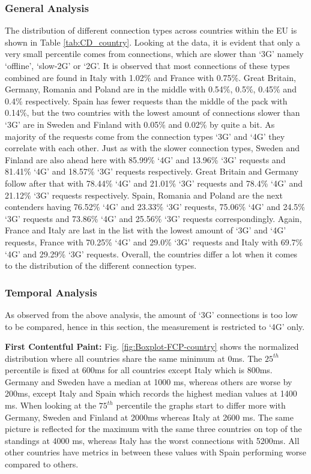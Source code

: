 \subsubsection{General Analysis} The distribution of different connection types across countries within the EU is shown in Table  \ref{tab:CD_country}. Looking at the data, it is evident that only a very small percentile comes from connections, which are slower than `3G’ namely `offline’, `slow-2G’ or `2G’. It is observed that most connections of these types combined are found in Italy with 1.02\% and France with 0.75\%. Great Britain, Germany, Romania and Poland are in the middle with 0.54\%, 0.5\%, 0.45\% and 0.4\% respectively. Spain has fewer requests than the middle of the pack with 0.14\%, but the two countries with the lowest amount of connections slower than `3G’ are in Sweden and Finland with 0.05\% and 0.02\% by quite a bit. As majority of the requests come from the connection types `3G’ and `4G’ they correlate with each other. Just as with the slower connection types, Sweden and Finland are also ahead here with 85.99\% `4G’ and 13.96\% `3G’ requests and 81.41\% `4G’ and 18.57\% `3G’ requests respectively. Great Britain and Germany follow after that with 78.44\% `4G’ and 21.01\% `3G’ requests and 78.4\% `4G’ and 21.12\% `3G’ requests respectively. Spain, Romania and Poland are the next contenders having 76.52\% `4G’ and 23.33\% `3G’ requests, 75.06\% `4G’ and 24.5\% `3G’ requests and 73.86\% `4G’ and 25.56\% `3G’ requests correspondingly. Again, France and Italy are last in the list with the lowest amount of `3G’ and `4G’ requests, France with 70.25\% `4G’ and 29.0\% `3G’ requests and Italy with 69.7\% `4G’ and 29.29\% `3G’ requests. Overall, the countries differ a lot when it comes to the distribution of the different connection types.



\subsubsection{Temporal Analysis} As observed from the above analysis, the amount of `3G' connections is too low to be compared, hence in this section, the measurement is restricted to `4G' only. %

\noindent\textbf{First Contentful Paint:} Fig. \ref{fig:Boxplot-FCP-country} shows the normalized distribution where all countries share the same minimum at 0ms. The ${25}^{th}$ percentile is fixed at 600ms for all countries except Italy which is 800ms. Germany and Sweden have a median at 1000 ms, whereas others are worse by 200ms, except Italy and Spain which records the highest median values at 1400 ms. When looking at the ${75}^{th}$ percentile the graphs start to differ more with Germany, Sweden and Finland at 2000ms whereas Italy at 2600 ms. The same picture is reflected for the maximum with the same three countries on top of the standings at 4000 ms, whereas  Italy has the worst connections with 5200ms. All other countries have metrics in between these values with Spain performing worse compared to others.

